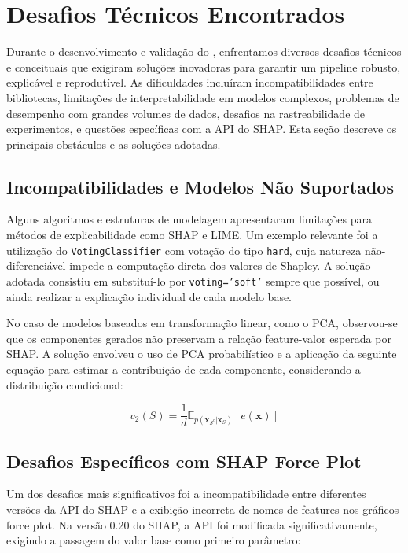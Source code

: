 \section{Desafios Técnicos Encontrados}
\label{sec:desafios}

Durante o desenvolvimento e validação do \toolname{}, enfrentamos diversos desafios técnicos e conceituais que exigiram soluções inovadoras para garantir um pipeline robusto, explicável e reprodutível. As dificuldades incluíram incompatibilidades entre bibliotecas, limitações de interpretabilidade em modelos complexos, problemas de desempenho com grandes volumes de dados, desafios na rastreabilidade de experimentos, e questões específicas com a API do SHAP. Esta seção descreve os principais obstáculos e as soluções adotadas.

\subsection*{Incompatibilidades e Modelos Não Suportados}

Alguns algoritmos e estruturas de modelagem apresentaram limitações para métodos de explicabilidade como SHAP e LIME. Um exemplo relevante foi a utilização do \texttt{VotingClassifier} com votação do tipo \texttt{hard}, cuja natureza não-diferenciável impede a computação direta dos valores de Shapley. A solução adotada consistiu em substituí-lo por \texttt{voting='soft'} sempre que possível, ou ainda realizar a explicação individual de cada modelo base.

No caso de modelos baseados em transformação linear, como o PCA, observou-se que os componentes gerados não preservam a relação feature-valor esperada por SHAP. A solução envolveu o uso de PCA probabilístico e a aplicação da seguinte equação para estimar a contribuição de cada componente, considerando a distribuição condicional:

\begin{equation}
    v_2(S) = \frac{1}{d}\mathbb{E}_{p(\bm{x}_{S^c}|\bm{x}_{S})}[e(\bm{x})]
\end{equation}

\subsection*{Desafios Específicos com SHAP Force Plot}

Um dos desafios mais significativos foi a incompatibilidade entre diferentes versões da API do SHAP e a exibição incorreta de nomes de features nos gráficos force plot. Na versão 0.20 do SHAP, a API foi modificada significativamente, exigindo a passagem do valor base como primeiro parâmetro:

